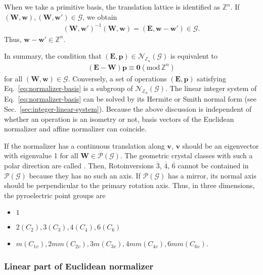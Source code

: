 When we take a primitive basis, the translation lattice is identified as $\mathbb{Z}^{n}$.
If $(\bm{W}, \bm{w} ), (\bm{W}, \bm{w}') \in \mathcal{G}$, we obtain
\begin{align}
  (\bm{W}, \bm{w}')^{-1} (\bm{W}, \bm{w}) = (\bm{E}, \bm{w} - \bm{w}' ) \in \mathcal{G}.
\end{align}
Thus, $\mathbf{w} - \mathbf{w}' \in \mathbb{Z}^{n}$.

In summary, the condition that $(\bm{E}, \bm{p} ) \in \mathcal{N}_{\mathcal{E}_{n}}(\mathcal{G})$ is equivalent to
\begin{align}
  \label{eq:normalizer-basis}
  (\bm{E} - \bm{W} ) \bm{p} \equiv \bm{0} ( \mathrm{mod} \, \mathbb{Z}^{n} )
\end{align}
for all $(\bm{W}, \bm{w}) \in \mathcal{G}$.
Conversely, a set of operations $(\bm{E}, \bm{p})$ satisfying Eq.~\eqref{eq:normalizer-basis} is a subgroup of $\mathcal{N}_{\mathcal{E}_{n}}(\mathcal{G})$.
The linear integer system of Eq.~\eqref{eq:normalizer-basis} can be solved by its Hermite or Smith normal form (see Sec.~\ref{sec:integer-linear-system}).
Because the above discussion is independent of whether an operation is an isometry or not, basis vectors of the Euclidean normalizer and affine normalizer can coincide.

If the normalizer has a continuous translation along $\bm{v}$, $\bm{v}$ should be an eigenvector with eigenvalue 1 for all $\bm{W} \in \mathcal{P}(\mathcal{G})$.
The geometric crystal classes with such a polar direction are called .
Then, Rotoinversions $\overline{3}$, $\overline{4}$, $\overline{6}$ cannot be contained in $\mathcal{P}(\mathcal{G})$ because they has no such an axis.
If $\mathcal{P}(\mathcal{G})$ has a mirror, its normal axis should be perpendicular to the primary rotation axis.
Thus, in three dimensions, the pyroelectric point groups are
\begin{itemize}
  \item $1$
  \item $2 (C_{2}), 3 (C_{3}), 4 (C_{4}), 6 (C_{6})$
  \item $m (C_{1v}), 2mm (C_{2v}), 3m (C_{3v}), 4mm (C_{4v}), 6mm (C_{6v})$.
\end{itemize}

\subsubsection{Linear part of Euclidean normalizer}

